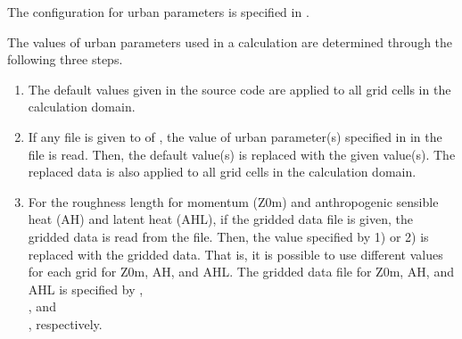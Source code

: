 The configuration for urban parameters is specified in .
%


The values of urban parameters used in a calculation are determined through the following three steps.
\begin{enumerate}[1)]
\item The default values given in the \scalelib source code are applied to all grid cells in the calculation domain.
\item If any file is given to  of ,
  the value of urban parameter(s) specified in  in the file is read.
  Then, the default value(s) is replaced with the given value(s).
  The replaced data is also applied to all grid cells in the calculation domain. 
\item For the roughness length for momentum (Z0m) and anthropogenic sensible heat (AH) and latent heat (AHL),
  if the gridded data file is given, the gridded data is read from the file. Then, the value specified by 1) or 2) is replaced with the gridded data.
  That is, it is possible to use different values for each grid for Z0m, AH, and AHL.
  The gridded data file for Z0m, AH, and AHL is specified by
  , \\
, and\\
, respectively.
\end{enumerate}


